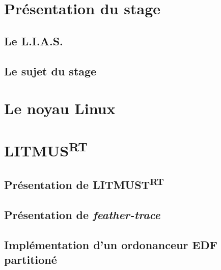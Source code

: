 \documentclass{article}
\begin{document}
    
\section*{Présentation du stage}
\subsection{Le L.I.A.S.}
\subsection{Le sujet du stage}
\newpage

\section{Le noyau Linux}

\newpage
\section{LITMUS\textsuperscript{RT}}
\subsection{Présentation de LITMUST\textsuperscript{RT}}

\subsection{Présentation de \textit{feather-trace}}

\subsection{Implémentation d'un ordonanceur EDF partitioné}


\newpage


\printnoidxglossaries
\end{document}
